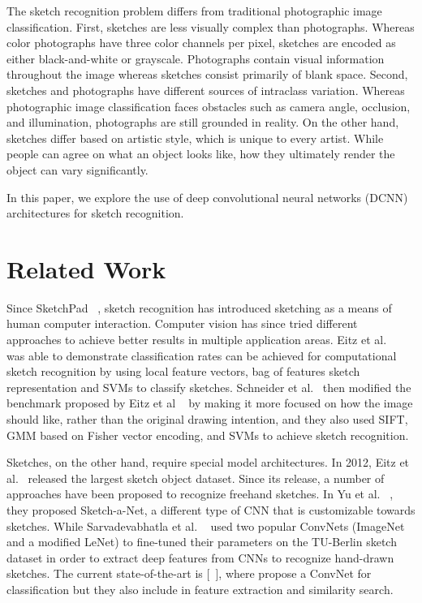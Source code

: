 \documentclass[10pt,twocolumn,letterpaper]{article}
\begin{document}
The sketch recognition problem differs from traditional photographic image classification. First, sketches are less visually complex than photographs. Whereas color photographs have three color channels per pixel, sketches are encoded as either black-and-white or grayscale. Photographs contain visual information throughout the image whereas sketches consist primarily of blank space. Second, sketches and photographs have different sources of intraclass variation. Whereas photographic image classification faces obstacles such as camera angle, occlusion, and illumination, photographs are still grounded in reality. On the other hand, sketches differ based on artistic style, which is unique to every artist. While people can agree on what an object looks like, how they ultimately render the object can vary significantly.

In this paper, we explore the use of deep convolutional neural networks (DCNN) architectures for sketch recognition.

\section{Related Work}

Since SketchPad ~\cite{sutherland1964sketchpad}, sketch recognition has introduced sketching as a means of human computer interaction. Computer vision has since tried different approaches to achieve better results in multiple application areas. Eitz et al. ~\cite{eitz2012hdhso} was able to demonstrate classification rates can be achieved for computational sketch recognition by using local feature vectors, bag of features sketch representation and SVMs to classify sketches. Schneider et al.~\cite{schneider2014sketch} then modified the benchmark proposed by Eitz et al ~\cite{eitz2012hdhso}  by making it more focused on how the image should like, rather than the original drawing intention, and they also used SIFT, GMM based on Fisher vector encoding, and SVMs to achieve sketch recognition.

Sketches, on the other hand, require special model architectures. In 2012, Eitz et al.~\cite{eitz2012hdhso} released the largest sketch object dataset. Since its release, a number of approaches have been proposed to recognize freehand sketches.  In Yu et al. ~\cite{yu2016sketch}, they proposed Sketch-a-Net, a different type of CNN that is customizable towards sketches. While Sarvadevabhatla et al. ~\cite{sarvadevabhatla2015freehand} used two popular ConvNets (ImageNet and a modified LeNet) to fine-tuned their parameters on the TU-Berlin sketch dataset in order to extract deep features from CNNs to recognize hand-drawn sketches. The current state-of-the-art is [~\cite{seddati2016deepsketch}], where propose a ConvNet for classification but they also include in feature extraction and similarity search. 
\end{document}
